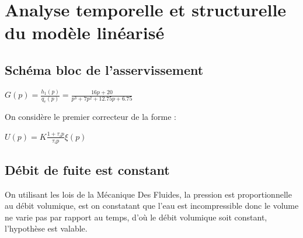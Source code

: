 \documentclass[12pt, a4paper, openany]{report}
\begin{document}
	
\chapter{Analyse temporelle et structurelle du modèle linéarisé }
 
 \section{Schéma bloc de l'asservissement}  %
   
   
   \begin{center}
   $G(p)=\frac {h_{1}(p)}{q_{e}(p)}=\frac{16p+20}{p^{3}+7p^{2}+12.75p+6.75}$   
   \end{center}
   
   On considère le premier correcteur de la forme : \\
   \begin{center}
   $U(p)=K\frac {1+\tau_{i}p}{\tau_{i}p}\xi(p)$ 
   \\[2cm]  
   \end{center}  
   
  
  
   
  
 \section{Débit de fuite est constant}  %
 
 
 On utilisant les lois de la Mécanique Des Fluides, la pression est proportionnelle au débit volumique, est on constatant que l'eau est incompressible donc le volume ne varie pas par rapport au temps, d’où le débit volumique soit constant, l'hypothèse est valable. 
 
\end{document}
